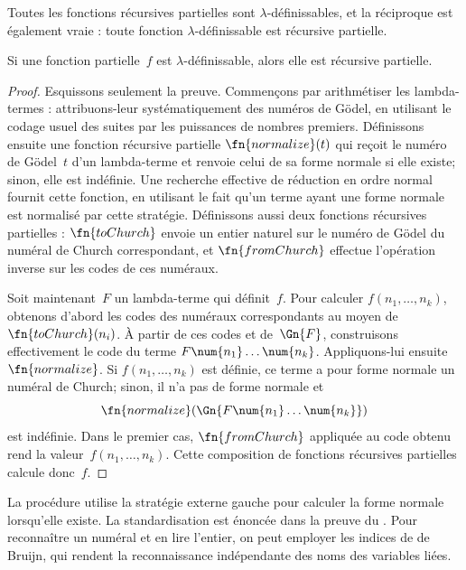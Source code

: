 \documentclass[../../../include/open-logic-section]{subfiles}
\begin{document}

Toutes les fonctions récursives
partielles sont $\lambda$-définissables,
et la réciproque est également vraie :
toute fonction $\lambda$-définissable
est récursive partielle.

\begin{thm}
Si une fonction partielle~$f$ est
$\lambda$-définissable, alors elle
est récursive partielle.
\end{thm}

\begin{proof}
Esquissons seulement la preuve.
Commençons par arithmétiser les
lambda-termes : attribuons-leur
systématiquement des numéros de Gödel,
en utilisant le codage usuel des suites
par les puissances de nombres premiers.
Définissons ensuite une fonction
récursive partielle $\fn{normalize}(t)$
qui reçoit le numéro de Gödel~$t$
d'un lambda-terme et renvoie celui
de sa forme normale si elle existe;
sinon, elle est indéfinie. Une recherche
effective de réduction en ordre normal
fournit cette fonction, en utilisant le
fait qu'un terme ayant une forme normale
est normalisé par cette stratégie.
Définissons aussi deux fonctions
récursives partielles :
$\fn{toChurch}$ envoie un entier naturel
sur le numéro de Gödel du numéral de
Church correspondant, et
$\fn{fromChurch}$ effectue l'opération
inverse sur les codes de ces numéraux.

Soit maintenant~$F$ un lambda-terme
qui définit~$f$. Pour calculer
$f(n_1,\dots,n_k)$, obtenons d'abord
les codes des numéraux correspondants
au moyen de $\fn{toChurch}(n_i)$.
À partir de ces codes et de~$\Gn{F}$,
construisons effectivement le code
du terme $F\num{n_1}\dots\num{n_k}$.
Appliquons-lui ensuite
$\fn{normalize}$. Si $f(n_1,\dots,n_k)$
est définie, ce terme a pour forme
normale un numéral de Church; sinon,
il n'a pas de forme normale et
\[
  \fn{normalize}
    (\Gn{F\num{n_1}\dots\num{n_k}})
\]
est indéfinie. Dans le premier cas,
$\fn{fromChurch}$ appliquée au code
obtenu rend la valeur~$f(n_1,\dots,n_k)$.
Cette composition de fonctions
récursives partielles calcule donc~$f$.
\end{proof}

La procédure utilise la stratégie externe gauche pour calculer
la forme normale lorsqu'elle existe. La standardisation est
énoncée dans la preuve du
.
Pour reconnaître un numéral et en lire l'entier, on peut employer
les indices de de Bruijn, qui rendent la reconnaissance
indépendante des noms des variables liées.
\end{document}
